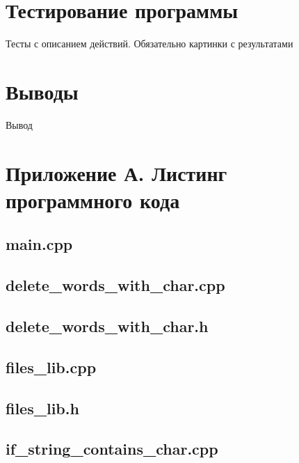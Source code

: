 \documentclass[12pt,a4paper]{article}  %
\begin{document}
	\section*{Тестирование программы}
	
	Тесты с описанием действий. Обязательно картинки с результатами
	
	\section*{Выводы}
	
	Вывод
	
	\newpage
	\section*{Приложение А. Листинг программного кода}

	\subsection*{main.cpp}
	
	
	\newpage
	\subsection*{delete\_words\_with\_char.cpp}
	
	
	\newpage
	\subsection*{delete\_words\_with\_char.h}
	
	
	\newpage
	\subsection*{files\_lib.cpp}
	
	
	\newpage
	\subsection*{files\_lib.h}
	
	
	\newpage
	\subsection*{if\_string\_contains\_char.cpp}
	
	
\end{document}
